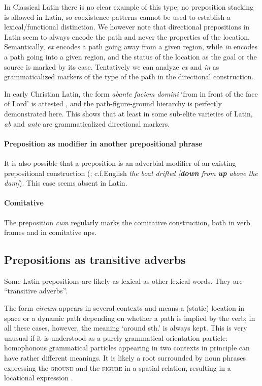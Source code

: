 \documentclass[a4paper, oneside, 12pt]{report}
\newcommand*{\citepage}[1]{p.~{#1}}
\newcommand{\form}[1]{\emph{#1}}
\newcommand*{\category}[1]{\textsc{#1}}
\newcommand{\translate}[1]{`#1'}
\begin{document}
In Classical Latin there is no clear example of this type:
no preposition stacking is allowed in Latin,
so coexistence patterns cannot be used to establish a lexical/functional distinction.
We however note that directional prepositions in Latin
seem to always encode the path
and never the properties of the location.
Semantically, \form{ex} encodes a path going away from a given region, 
while \form{in} encodes a path going into a given region,
and the status of the location as the goal or the source
is marked by its case.
Tentatively we can analyze \form{ex} and \form{in}
as grammaticalized markers of the type of the path in the directional construction.

In early Christian Latin, the form \form{abante faciem domini}
\translate{from in front of the face of Lord} is attested
\citep[\citepage{24}]{herman2010vulgar},
and the path-figure-ground hierarchy is perfectly demonstrated here.
This shows that at least in some sub-elite varieties of Latin,
\form{ab} and \form{ante} are grammaticalized directional markers.

\paragraph*{Preposition as modifier in another prepositional phrase}
It is also possible that a preposition is an adverbial modifier of an existing prepositional construction
(\citealt{botwinik2008greek};
c.f.English \form{the boat drifted [\textbf{down} from \textbf{up} above the dam]}).
This case seems absent in Latin.

\paragraph*{Comitative}
\label{sec:modifiy.prep.grammar.comitative}
The preposition \form{cum} regularly marks the comitative construction,
both in verb frames and in comitative \acp{np}.

\subsection{Prepositions as transitive adverbs}

Some Latin prepositions are likely as lexical as other lexical words.
They are ``transitive adverbs''.

The form \form{circum} appears in several contexts
and means a (static) location in space or a dynamic path 
depending on whether a path is implied by the verb;
in all these cases, however, the meaning \translate{around sth.} is always kept.
This is very unusual if it is understood as a purely grammatical orientation particle:
homophonous grammatical particles appearing in two contexts in principle can have rather different meanings.
It is likely a root surrounded by noun phrases expressing the \category{ground} and the \category{figure} 
in a spatial relation,
resulting in a locational expression \citet{mare2018issues}.
\end{document}
